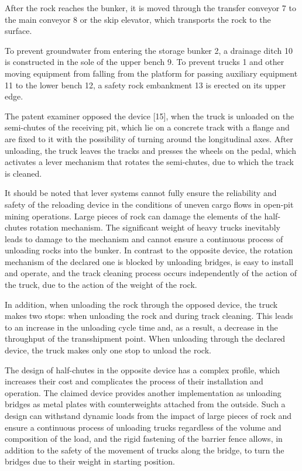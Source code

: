 \begin{multicols}{2}
After the rock reaches the bunker, it is moved through the transfer
conveyor 7 to the main conveyor 8 or the skip elevator, which transports
the rock to the surface.

To prevent groundwater from entering the storage bunker 2, a drainage
ditch 10 is constructed in the sole of the upper bench 9. To prevent
trucks 1 and other moving equipment from falling from the platform for
passing auxiliary equipment 11 to the lower bench 12, a safety rock
embankment 13 is erected on its upper edge.

The patent examiner opposed the device {[}15{]}, when the truck is
unloaded on the semi-chutes of the receiving pit, which lie on a
concrete track with a flange and are fixed to it with the possibility of
turning around the longitudinal axes. After unloading, the truck leaves
the tracks and presses the wheels on the pedal, which activates a lever
mechanism that rotates the semi-chutes, due to which the track is
cleaned.

It should be noted that lever systems cannot fully ensure the
reliability and safety of the reloading device in the conditions of
uneven cargo flows in open-pit mining operations. Large pieces of rock
can damage the elements of the half-chutes rotation mechanism. The
significant weight of heavy trucks inevitably leads to damage to the
mechanism and cannot ensure a continuous process of unloading rocks into
the bunker. In contrast to the opposite device, the rotation mechanism
of the declared one is blocked by unloading bridges, is easy to install
and operate, and the track cleaning process occurs independently of the
action of the truck, due to the action of the weight of the rock.

In addition, when unloading the rock through the opposed device, the
truck makes two stops: when unloading the rock and during track
cleaning. This leads to an increase in the unloading cycle time and, as
a result, a decrease in the throughput of the transshipment point. When
unloading through the declared device, the truck makes only one stop to
unload the rock.

The design of half-chutes in the opposite device has a complex profile,
which increases their cost and complicates the process of their
installation and operation. The claimed device provides another
implementation as unloading bridges as metal plates with counterweights
attached from the outside. Such a design can withstand dynamic loads
from the impact of large pieces of rock and ensure a continuous process
of unloading trucks regardless of the volume and composition of the
load, and the rigid fastening of the barrier fence allows, in addition
to the safety of the movement of trucks along the bridge, to turn the
bridges due to their weight in starting position.


\end{multicols}
